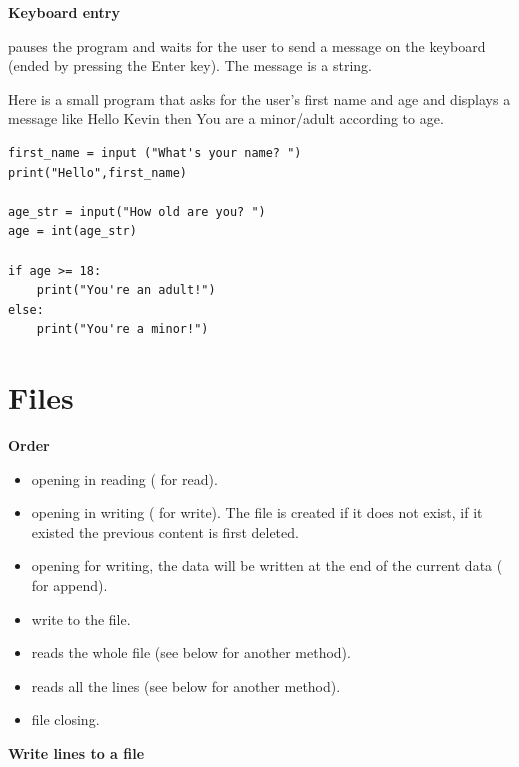 \documentclass[11pt,class=report,crop=false]{standalone}
\begin{document}
\bigskip

\textbf{Keyboard entry}

 \quad pauses the program and waits for the user to send a message on the keyboard (ended by pressing the \og{}Enter\fg{} key). The message is a string.

Here is a small program that asks for the user's first name and age and displays a message like 
\og{}Hello Kevin\fg{} then \og{}You are a minor/adult\fg{} according to age. 
\begin{lstlisting}
first_name = input ("What's your name? ")
print("Hello",first_name)

age_str = input("How old are you? ")
age = int(age_str)

if age >= 18:
    print("You're an adult!")
else:
    print("You're a minor!")
\end{lstlisting}  




\section{Files}

\textbf{Order} 

\begin{itemize}
  \item {} \quad opening in reading ( for read).
  \item {} \quad opening in writing ( for write). The file is created if it does not exist, if it existed the previous content is first deleted.
  \item {} \quad opening for writing, the data will be written at the end of the current data ( for append).
  
  \item {} \quad write to the file.
  \item {} \quad reads the whole file (see below for another method).
  \item {} \quad reads all the lines (see below for another method).
  
  \item {} \quad file closing.
\end{itemize}

\bigskip

\textbf{Write lines to a file} 
\end{document}

